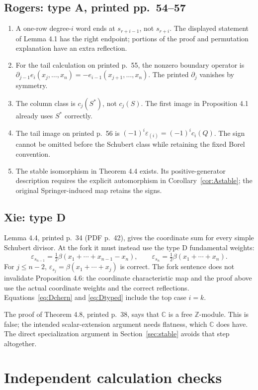 \documentclass[11pt,letterpaper]{article}
\theoremstyle{remark}
\newcommand{\eps}{\varepsilon}
\newcommand{\C}{\mathbb C}
\newcommand{\Z}{\mathbb Z}
\begin{document}
\subsection{Rogers: type A, printed pp.\ 54--57}
\begin{enumerate}
 \item A one-row degree-$i$ word ends at $s_{r+i-1}$, not $s_{r+i}$. The displayed statement of Lemma 4.1 has the right endpoint; portions of the proof and permutation explanation have an extra reflection.
 \item For the tail calculation on printed p.~55, the nonzero boundary operator is $\partial_{j-1}e_i(x_j,\ldots,x_n)=-e_{i-1}(x_{j+1},\ldots,x_n)$. The printed $\partial_j$ vanishes by symmetry.
 \item The column class is $c_j(S^*)$, not $c_j(S)$. The first image in Proposition 4.1 already uses $S^*$ correctly.
 \item The tail image on printed p.~56 is $(-1)^i\eps_{(i)}=(-1)^ic_i(Q)$. The sign cannot be omitted before the Schubert class while retaining the fixed Borel convention.
 \item The stable isomorphism in Theorem 4.4 exists. Its positive-generator description requires the explicit automorphism in Corollary~\ref{cor:Astable}; the original Springer-induced map retains the signs.
\end{enumerate}

\subsection{Xie: type D}
Lemma 4.4, printed p.~34 (PDF p.~42), gives the coordinate sum for every simple Schubert divisor. At the fork it must instead use the type D fundamental weights:
\[
 \eps_{s_{n-1}}=\tfrac12\beta(x_1+\cdots+x_{n-1}-x_n),\qquad
 \eps_{s_n}=\tfrac12\beta(x_1+\cdots+x_n).
\]
For $j\leq n-2$, $\eps_{s_j}=\beta(x_1+\cdots+x_j)$ is correct. The fork sentence does not invalidate Proposition 4.6: the coordinate characteristic map and the proof above use the actual coordinate weights and the correct reflections. Equations~\eqref{eq:Dchern} and \eqref{eq:Dtyped} include the top case $i=k$.

The proof of Theorem 4.8, printed p.~38, says that $\C$ is a free $\Z$-module. This is false; the intended scalar-extension argument needs flatness, which $\C$ does have. The direct specialization argument in Section~\ref{sec:stable} avoids that step altogether.

\section{Independent calculation checks}
\label{sec:checks}
\end{document}
